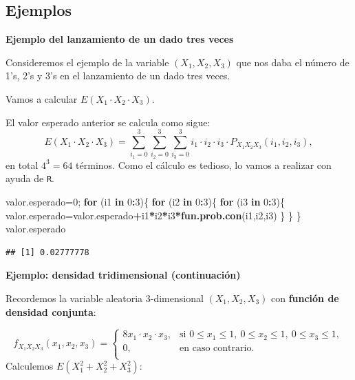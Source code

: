 \documentclass[]{book}
\newenvironment{Shaded}{\begin{snugshade}}{\end{snugshade}}
\newcommand{\ControlFlowTok}[1]{\textcolor[rgb]{0.13,0.29,0.53}{\textbf{#1}}}
\newcommand{\DecValTok}[1]{\textcolor[rgb]{0.00,0.00,0.81}{#1}}
\newcommand{\KeywordTok}[1]{\textcolor[rgb]{0.13,0.29,0.53}{\textbf{#1}}}
\newcommand{\NormalTok}[1]{#1}
\newcommand{\OperatorTok}[1]{\textcolor[rgb]{0.81,0.36,0.00}{\textbf{#1}}}
\begin{document}
\hypertarget{ejemplos-12}{%
\subsection{Ejemplos}\label{ejemplos-12}}

\textbf{Ejemplo del lanzamiento de un dado tres veces}

Consideremos el ejemplo de la variable \((X_1,X_2,X_3)\) que nos daba el número de 1's, 2's y 3's en el lanzamiento de un dado tres veces.

Vamos a calcular \(E\left(X_1\cdot X_2\cdot X_3\right)\).

El valor esperado anterior se calcula como sigue:
\[
E\left(X_1\cdot X_2\cdot X_3\right)\displaystyle =\sum_{i_1=0}^3\sum_{i_2=0}^3
\sum_{i_3=0}^3 i_1\cdot i_2\cdot i_3\cdot P_{X_1X_2X_3}(i_1,i_2,i_3),
\]
en total \(4^3=64\) términos. Como el cálculo es tedioso, lo vamos a realizar con ayuda de \texttt{R}.

\begin{Shaded}
\begin{Highlighting}[]
\NormalTok{valor.esperado=}\DecValTok{0}\NormalTok{;}
\ControlFlowTok{for}\NormalTok{ (i1 }\ControlFlowTok{in} \DecValTok{0}\OperatorTok{:}\DecValTok{3}\NormalTok{)\{}
  \ControlFlowTok{for}\NormalTok{ (i2 }\ControlFlowTok{in} \DecValTok{0}\OperatorTok{:}\DecValTok{3}\NormalTok{)\{}
    \ControlFlowTok{for}\NormalTok{ (i3 }\ControlFlowTok{in} \DecValTok{0}\OperatorTok{:}\DecValTok{3}\NormalTok{)\{}
\NormalTok{      valor.esperado=valor.esperado}\OperatorTok{+}\NormalTok{i1}\OperatorTok{*}\NormalTok{i2}\OperatorTok{*}\NormalTok{i3}\OperatorTok{*}\KeywordTok{fun.prob.con}\NormalTok{(i1,i2,i3)}
\NormalTok{    \}}
\NormalTok{  \}}
\NormalTok{\}}
\NormalTok{valor.esperado}
\end{Highlighting}
\end{Shaded}

\begin{verbatim}
## [1] 0.02777778
\end{verbatim}

\textbf{Ejemplo: densidad tridimensional (continuación)}

Recordemos la variable aleatoria \(3\)-dimensional \((X_1,X_2,X_3)\) con \textbf{función de densidad conjunta}:

\[
f_{X_1X_2X_3}(x_1,x_2,x_3)=\begin{cases}
8 x_1\cdot x_2\cdot x_3, & \mbox{si }0\leq x_1\leq 1,\ 0\leq x_2\leq 1,\ 0\leq x_3\leq 1, \\
0, & \mbox{en caso contrario.}\\
\end{cases}
\]
Calculemos \(E(X_1^2+X_2^2+X_3^2)\):
\end{document}
